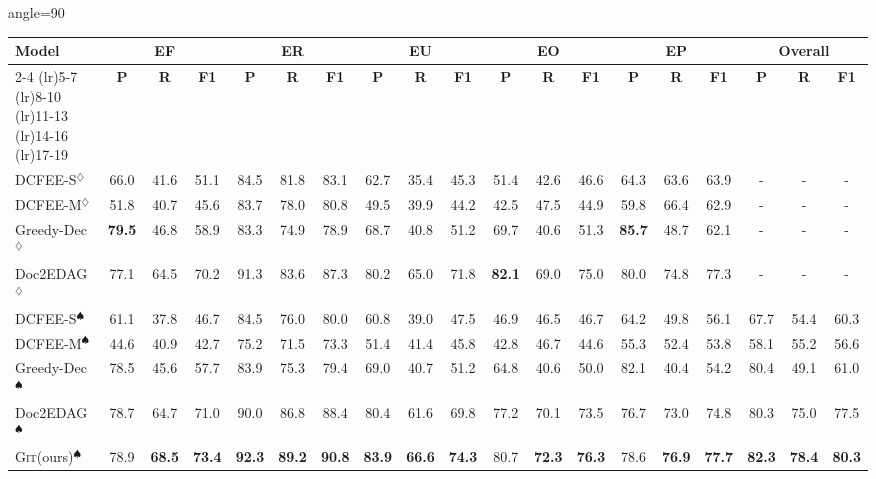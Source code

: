 \documentclass[11pt,a4paper]{article}
\newcommand{\modelname}{\textsc{Git}\xspace}
\begin{document}
\begin{table*}[htbp]
\centering
\begin{adjustbox}{angle=90}
\begin{tabular}{lcccccccccccccccccc}
\hline
\multirow{2}{*}{\bf Model} & \multicolumn{3}{c}{\bf EF} & \multicolumn{3}{c}{\bf ER} & \multicolumn{3}{c}{\bf EU} & \multicolumn{3}{c}{\bf EO} & \multicolumn{3}{c}{\bf EP} & \multicolumn{3}{c}{\bf Overall}\\ 
\cmidrule(lr){2-4} 
\cmidrule(lr){5-7}
\cmidrule(lr){8-10}
\cmidrule(lr){11-13}
\cmidrule(lr){14-16}
\cmidrule(lr){17-19}
~ & \bf P & \bf R & \bf F1  & \bf P & \bf R & \bf F1 & \bf P & \bf R & \bf F1 & \bf P & \bf R & \bf F1 & \bf P & \bf R & \bf F1 & \bf P & \bf R & \bf F1 \\
\hline
DCFEE-S$^\diamondsuit$  & 66.0 & 41.6 & 51.1 & 84.5 & 81.8 & 83.1 & 62.7 & 35.4 & 45.3 & 51.4 & 42.6 & 46.6 & 64.3 & 63.6 & 63.9 & - & - & - \\
DCFEE-M$^\diamondsuit$  & 51.8 & 40.7 & 45.6 & 83.7 & 78.0 & 80.8 & 49.5 & 39.9 & 44.2 & 42.5 & 47.5 & 44.9 & 59.8 & 66.4 & 62.9 & - & - & - \\
Greedy-Dec$^\diamondsuit$  & \bf 79.5 & 46.8 & 58.9 & 83.3 & 74.9 & 78.9 & 68.7 & 40.8 & 51.2 & 69.7 & 40.6 & 51.3 & \bf 85.7 & 48.7 & 62.1 & - & - & - \\
Doc2EDAG$^\diamondsuit$  & 77.1 & 64.5 & 70.2 & 91.3 & 83.6 & 87.3 & 80.2 & 65.0 & 71.8 & \bf 82.1 & 69.0 & 75.0 & 80.0 & 74.8 & 77.3 & - & - & - \\
\hline
DCFEE-S$^\spadesuit$  & 61.1 & 37.8 & 46.7 & 84.5 & 76.0 & 80.0 & 60.8 & 39.0 & 47.5 & 46.9 & 46.5 & 46.7 & 64.2 & 49.8 & 56.1 & 67.7 & 54.4 & 60.3 \\
DCFEE-M$^\spadesuit$  & 44.6 & 40.9 & 42.7 & 75.2 & 71.5 & 73.3 & 51.4 & 41.4 & 45.8 & 42.8 & 46.7 & 44.6 & 55.3 & 52.4 & 53.8 & 58.1 & 55.2 & 56.6 \\
Greedy-Dec$^\spadesuit$  & 78.5 & 45.6 & 57.7 & 83.9 & 75.3 & 79.4 & 69.0 & 40.7 & 51.2 & 64.8 & 40.6 & 50.0 & 82.1 & 40.4 & 54.2 & 80.4 & 49.1 & 61.0 \\
Doc2EDAG$^\spadesuit$  & 78.7 & 64.7 & 71.0 & 90.0 & 86.8 & 88.4 & 80.4 & 61.6 & 69.8 & 77.2 & 70.1 & 73.5 & 76.7 & 73.0 & 74.8 & 80.3 & 75.0 & 77.5 \\
\hline
\modelname (ours)$^\spadesuit$ & 78.9 & \bf 68.5 & \bf 73.4 & \bf 92.3 & \bf 89.2 & \bf 90.8 & \bf 83.9 & \bf 66.6 & \bf 74.3 & 80.7 & \bf 72.3 & \bf 76.3 & 78.6 & \bf 76.9 & \bf 77.7 & \bf 82.3 & \bf 78.4 & \bf 80.3 \\
\hline
\end{tabular}
\end{adjustbox}
\caption{Comprehensive results of event record extraction. Results with $\diamondsuit$ are results reported in \citet{zheng-etal-2019-doc2edag}. Results with are $\spadesuit$ results we implement on our own. Our \modelname consistently outperform other baselines.
}
\label{table:all}
\end{table*}
\end{document}
